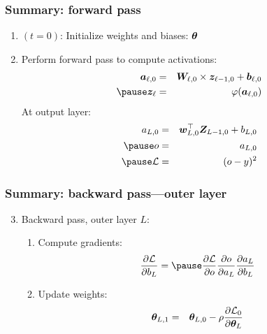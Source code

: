 \documentclass[smaller]{beamer}
\begin{document}
\begin{frame}
  \frametitle{Summary: forward pass}
  \begin{enumerate}[<+->]
  \item $(t=0)$: Initialize weights and biases: $\bm{\theta}$
  \item Perform forward pass to compute activations:
    \begin{eqnarray}
      \bm a_{\ell,0} &=& \bm W_{\ell,0} \times \bm z_{\ell-1,0} +\bm b_{\ell,0} \\\pause
    \bm z_{\ell} &=& \varphi(\bm a_{\ell,0}) 
    \end{eqnarray}
    \pause
    At output layer:
    \begin{eqnarray}      
     a_{L,0} &=& \bm w_{L,0}\tr \bm Z_{L-1,0} + b_{L,0} \\\pause
      o &=& a_{L,0}\\\pe
      \mc L &=& (o  - y)^2
    \end{eqnarray}
  \end{enumerate}
\end{frame}

\begin{frame}
  \frametitle{Summary: backward pass---outer layer }
  \begin{enumerate}[<+->]\setcounter{enumi}{2}
  \item Backward pass, outer layer $L$:\pause
    \begin{enumerate}[a]
    \item Compute gradients: \pause
      \begin{eqnarray}
       \pd{\mc{L}}{b_{L}} = \pause \pd{\mc{L}}{o}\pd{o}{a_{L}}\pd{a_{L}}{b_{L}}
      \end{eqnarray}
    \item Update weights: \pause
      \begin{eqnarray}
        \bm {\theta}_{L, 1}  &=&  \bm{\theta}_{L,0} - \rho \frac{\partial{\mathcal{L}_0}}{\partial{\bm{\theta}_{L}}}   
      \end{eqnarray}
  \end{enumerate}
  \end{enumerate}
\end{frame}
\end{document}
